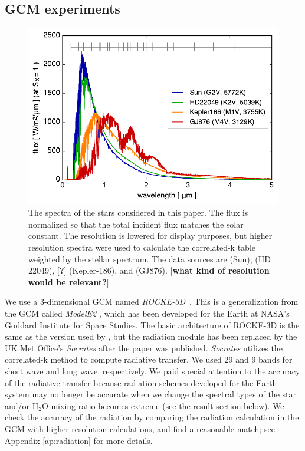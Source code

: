 \documentclass[11pt,numberedappendix,twocolappendix,]{emulateapj}
\def\water{H$_2$O }
\def\modelE{{\it ROCKE-3D}}
\def\memo#1{\color{red}$[${\bf #1}$]$ \color{black}}
\begin{document}
\subsection{GCM experiments}

\begin{figure}[!bh]
    \begin{center}
    \includegraphics[width=\hsize]{fig/star_spectra.pdf}
    \end{center}
\caption{The spectra of the stars considered in this paper. The flux is normalized so that the total incident flux matches the solar constant. The resolution is lowered for display purposes, but higher resolution spectra were used to calculate the correlated-k table weighted by the stellar spectrum. The data sources are \citet{Kurucz1995} (Sun), \citet{Segura2003} (HD 22049), \memo{?} (Kepler-186), and \citet{Domagal-Goldman2014} (GJ876). \memo{what kind of resolution would be relevant?}}
\label{fig:star_spectra}
\end{figure}

We use a 3-dimensional GCM named \modelE \ \citep{Way2017}. 
This is a generalization from the GCM called {\it ModelE2} \citep{Schmidt2014}, which has been developed for the Earth at NASA's Goddard Institute for Space Studies. 
The basic architecture of ROCKE-3D is the same as the version used by \citet{way2016}, but the radiation module has been replaced by the UK Met Office's {\it Socrates} \citep{Edwards1996} after the paper was published. 
{\it Socrates} utilizes the correlated-k method to compute radiative transfer. 
We used 29 and 9 bands for short wave and long wave, respectively. 
We paid special attention to the accuracy of the radiative transfer because radiation schemes developed for the Earth system may no longer be accurate when we change the spectral types of the star and/or \water mixing ratio becomes extreme (see the result section below). 
We check the accuracy of the radiation by comparing the radiation calculation in the GCM with higher-resolution calculations, and find a reasonable match;  see Appendix \ref{ap:radiation} for more details. 
\end{document}
